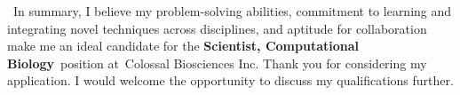 \documentclass[11pt, a4paper]{awesome-cv}
\newcommand{\companyname}{Colossal Biosciences Inc}
\newcommand{\role}{Scientist, Computational Biology}
\newcommand{\brole}{\textbf{\role}}
\begin{document}
\begin{cvletter}
		~In summary, I believe my problem-solving abilities, commitment to learning and integrating novel techniques across disciplines, and aptitude for collaboration make me an ideal candidate for the \brole~position at~\companyname.
%
		Thank you for considering my application. I would welcome the opportunity to discuss my qualifications further.
	\end{cvletter}

	\makeletterclosing
\end{document}
